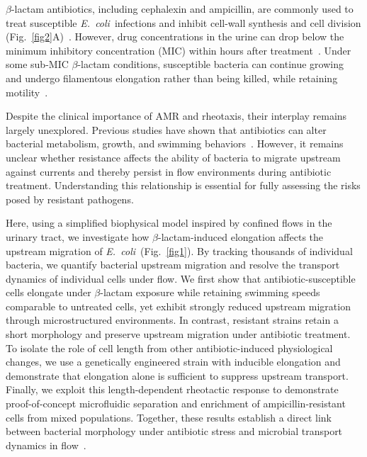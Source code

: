 \documentclass[twoside,twocolumn,9pt]{article}
\newcommand{\ecoli}{{\it E.~coli}}
\begin{document}
    $\beta$-lactam antibiotics, including cephalexin and ampicillin, are commonly used to treat susceptible \ecoli\ infections and inhibit cell-wall synthesis and cell division (Fig.~\ref{fig2}A)~\cite{Kohanski2010-tt,Typas2011-bb}. However, drug concentrations in the urine can drop below the minimum inhibitory concentration (MIC) within hours after treatment~\cite{Melnick2023ImpactInfections}. Under some sub-MIC $\beta$-lactam conditions, susceptible bacteria can continue growing and undergo filamentous elongation rather than being killed, while retaining motility~\cite{Tilanus2023-hf,Maki2000-kp, Cylke2022-iy, Justice2006-gn, Phan2018-gt}.
    
    Despite the clinical importance of AMR and rheotaxis, their interplay remains largely unexplored. Previous studies have shown that antibiotics can alter bacterial metabolism, growth, and swimming behaviors~\cite{Kohanski2010-tt,Cylke2022-iy,Phan2018-gt,Maki2000-kp,Oliveira2022-pc}. However, it remains unclear whether resistance affects the ability of bacteria to migrate upstream against currents and thereby persist in flow environments during antibiotic treatment. Understanding this relationship is essential for fully assessing the risks posed by resistant pathogens.
    
    Here, using a simplified biophysical model inspired by confined flows in the urinary tract, we investigate how $\beta$-lactam-induced elongation affects the upstream migration of \ecoli\ (Fig.~\ref{fig1}). By tracking thousands of individual bacteria, we quantify bacterial upstream migration and resolve the transport dynamics of individual cells under flow. We first show that antibiotic-susceptible cells elongate under $\beta$-lactam exposure while retaining swimming speeds comparable to untreated cells, yet exhibit strongly reduced upstream migration through microstructured environments. In contrast, resistant strains retain a short morphology and preserve upstream migration under antibiotic treatment. To isolate the role of cell length from other antibiotic-induced physiological changes, we use a genetically engineered strain with inducible elongation and demonstrate that elongation alone is sufficient to suppress upstream transport. Finally, we exploit this length-dependent rheotactic response to demonstrate proof-of-concept microfluidic separation and enrichment of ampicillin-resistant cells from mixed populations. Together, these results establish a direct link between bacterial morphology under antibiotic stress and microbial transport dynamics in flow~\cite{Karita2022-tn,Shuppara2025-xl, Chopra2022-ee, Daddi-Moussa-Ider2020-yk}.
\end{document}
